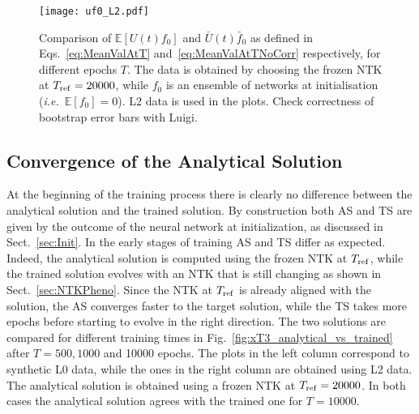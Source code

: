 \begin{figure}[t!]
  \centering
  \texttt{[image: uf0\_L2.pdf]}
  \caption{Comparison of $\mathbb{E}\left[U(t) f_{0}\right]$ and $\bar{U}(t)
    \bar{f}_{0}$ as defined in Eqs.~\eqref{eq:MeanValAtT}
    and~\eqref{eq:MeanValAtTNoCorr} respectively, for different epochs $T$. The
    data is obtained by choosing the frozen NTK at $T_{\rm ref} = 20000$, while
    $f_0$ is an ensemble of networks at initialisation (\textit{i.e.}\
    $\mathbb{E}[f_0]=0$). L2 data is used in the plots. \ac{Check correctness of
    bootstrap error bars with Luigi.}}
    \label{fig:xT3_exp_val}
  \end{figure}

\FloatBarrier

\subsection{Convergence of the Analytical Solution}
\label{sec:CheckAnalyticalConvergence}

At the beginning of the training process there is clearly no difference between
the analytical solution and the trained solution. By construction both AS and TS
are given by the outcome of the neural network at initialization, as discussed
in Sect.~\ref{sec:Init}. In the early stages of training AS and TS differ as
expected. Indeed, the analytical solution is computed using the frozen NTK at
$T_{\rm ref}$, while the trained solution evolves with an NTK that is still
changing as shown in Sect.~\ref{sec:NTKPheno}. Since the NTK at $T_{\rm ref}$ is
already aligned with the solution, the AS converges faster to the target
solution, while the TS takes more epochs before starting to evolve in the right
direction. The two solutions are compared for different training times in
Fig.~\ref{fig:xT3_analytical_vs_trained} after $T=500, 1000$ and 10000 epochs.
The plots in the left column correspond to synthetic L0 data, while the ones in
the right column are obtained using L2 data. The analytical solution is obtained
using a frozen NTK at $T_{\rm ref}=20000$. In both cases the analytical solution
agrees with the trained one for $T=10000$.

